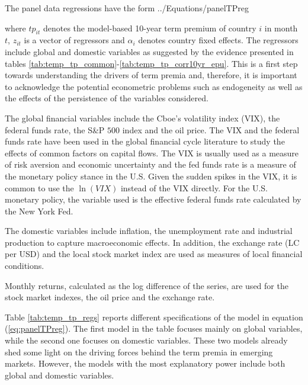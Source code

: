 {The panel data regressions have the form
	 {../Equations/panelTPreg}

\noindent where $tp_{it}$ denotes the model-based 10-year term premium of country $i$ in month $t$, $z_{it}$ is a vector of regressors and $\alpha_{i}$ denotes country fixed effects. The regressors include global and domestic variables as suggested by the evidence presented in tables \ref{tab:temp_tp_common}-\ref{tab:temp_tp_corr10yr_epu}. This is a first step towards understanding the drivers of term premia and, therefore, it is important to acknowledge the potential econometric problems such as endogeneity as well as the effects of the persistence of the variables considered.

The global financial variables include the Cboe's volatility index (VIX), the federal funds rate, the S\&P $500$ index and the oil price. The VIX and the federal funds rate have been used in the global financial cycle literature \citep[see][]{Rey:2013} to study the effects of common factors on capital flows. The VIX is usually used as a measure of risk aversion and economic uncertainty and the fed funds rate is a measure of the monetary policy stance in the U.S. Given the sudden spikes in the VIX, it is common to use the $\ln \left( VIX \right)$ instead of the VIX directly. For the U.S. monetary policy, the variable used is the effective federal funds rate calculated by the New York Fed. 
 
 The domestic variables include inflation, the unemployment rate and industrial production to capture macroeconomic effects. In addition, the exchange rate (LC per USD) and the local stock market index are used as measures of local financial conditions. 
 
 Monthly returns, calculated as the log difference of the series, are used for the stock market indexes, the oil price and the exchange rate.

Table \ref{tab:temp_tp_regs} reports different specifications of the model in equation (\ref{eq:panelTPreg}). The first model in the table focuses mainly on global variables, while the second one focuses on domestic variables. These two models already shed some light on the driving forces behind the term premia in emerging markets. However, the models with the most explanatory power include both global and domestic variables.
%	
	

}

